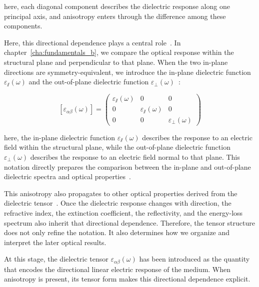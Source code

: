 here, each diagonal component describes the dielectric response along one principal axis,
and anisotropy enters through the difference among these components.

Here, this directional dependence plays a central role~\cite{slavich2024exploring}.
In chapter~\ref{cha:fundamentals_b}, we compare the optical response within the structural plane and perpendicular to that plane.
When the two in-plane directions are symmetry-equivalent,
we introduce the in-plane dielectric function $\varepsilon_{\varparallel}(\omega)$ and the out-of-plane dielectric function $\varepsilon_{\perp}(\omega)$~\cite{nye1985physical,guo2021complete,matthes2016influence}:

\begin{equation}
    \left[\varepsilon_{\alpha\beta}(\omega)\right] = \begin{pmatrix}
        \varepsilon_{\varparallel}(\omega) & 0 & 0 \\
        0 & \varepsilon_{\varparallel}(\omega) & 0 \\
        0 & 0 & \varepsilon_{\perp}(\omega)
    \end{pmatrix}
\label{inplane_outofplane_dielectric_tensor}
\end{equation}

here, the in-plane dielectric function $\varepsilon_{\varparallel}(\omega)$ describes the response to an electric field within the structural plane,
while the out-of-plane dielectric function $\varepsilon_{\perp}(\omega)$ describes the response to an electric field normal to that plane.
This notation directly prepares the comparison between the in-plane and out-of-plane dielectric spectra and optical properties~\cite{guo2021complete,slavich2024exploring}.

This anisotropy also propagates to other optical properties derived from the dielectric tensor~\cite{sujith2023large,slavich2024exploring}.
Once the dielectric response changes with direction, the refractive index, the extinction coefficient, the reflectivity, and the energy-loss spectrum also inherit that directional dependence.
Therefore, the tensor structure does not only refine the notation.
It also determines how we organize and interpret the later optical results.

At this stage, the dielectric tensor $\varepsilon_{\alpha\beta}(\omega)$ has been introduced as the quantity that encodes the directional linear electric response of the medium.
When anisotropy is present, its tensor form makes this directional dependence explicit.

